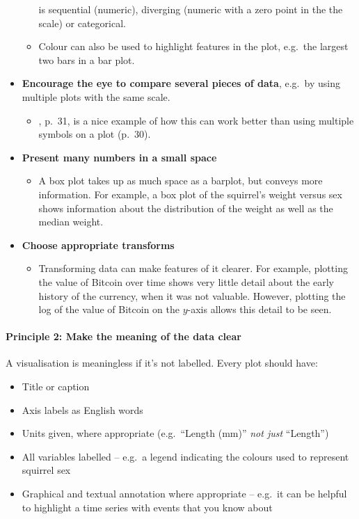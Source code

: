 \documentclass[10pt]{article}
\begin{document}
\begin{multicols}{3}
\begin{itemize}
\begin{itemize}
    is sequential (numeric), diverging (numeric with a zero point in
    the the scale) or categorical.
  \item Colour can also be used to highlight features in the plot,
    e.g.~the largest two bars in a bar plot.
  \end{itemize}
\item \textbf{Encourage the eye to compare several pieces of data}, e.g.~by
  using multiple plots with the same scale.
  \begin{itemize}
  \item \citet{WexlEtal17big}, p.~31, is a nice example of how this
    can work better than using multiple symbols on a plot (p.~30).
  \end{itemize}

\item \textbf{Present many numbers in a small space}
  \begin{itemize}
  \item A box plot takes up as much space as a barplot, but conveys
    more information. For example, a box plot of the squirrel's weight
    versus sex shows information about the distribution of the weight
    as well as the median weight.
  \end{itemize}
\item \textbf{Choose appropriate transforms}
  \begin{itemize}
  \item Transforming data can make features of it clearer. For
    example, plotting the value of Bitcoin over time shows very little
    detail about the early history of the currency, when it was not
    valuable. However, plotting the log of the value of Bitcoin on the
    $y$-axis allows this detail to be seen.
  \end{itemize}
\end{itemize}


\paragraph{Principle 2:  Make the meaning of the data clear}

A visualisation is meaningless if it's not labelled. Every plot should have:
\begin{itemize}
\item Title or caption
\item Axis labels as English words
\item Units given, where appropriate (e.g.~``Length (mm)''
  \emph{not just} ``Length'')
\item All variables labelled -- e.g.~a legend indicating the colours
  used to represent squirrel sex
\item Graphical and textual annotation where appropriate -- e.g.~it
  can be helpful to highlight a time series with events that you know
  about
\end{itemize}


\end{multicols}
\end{document}
